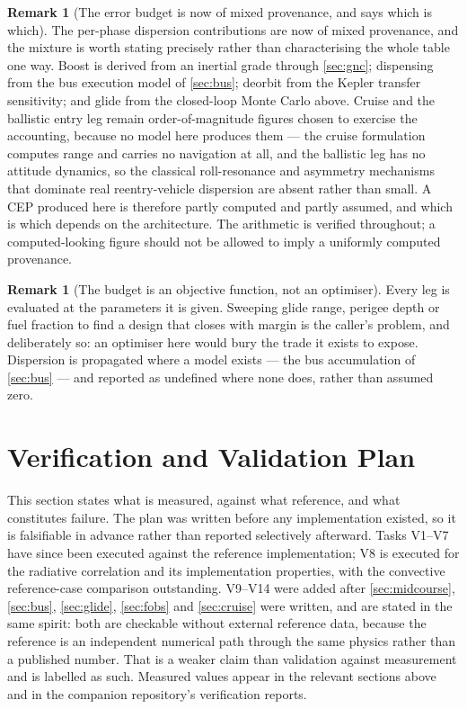 \documentclass[11pt,a4paper]{article}
\theoremstyle{definition}
\newtheorem{remark}[theorem]{Remark}
\numberwithin{equation}{section}
\begin{document}
\begin{remark}[The error budget is now of mixed provenance, and says which is which]
The per-phase dispersion contributions are now of mixed provenance, and the mixture is worth stating precisely rather than characterising the whole table one way. Boost is derived from an inertial grade through \cref{sec:gnc}; dispensing from the bus execution model of \cref{sec:bus}; deorbit from the Kepler transfer sensitivity; and glide from the closed-loop Monte Carlo above. Cruise and the ballistic entry leg remain order-of-magnitude figures chosen to exercise the accounting, because no model here produces them --- the cruise formulation computes range and carries no navigation at all, and the ballistic leg has no attitude dynamics, so the classical roll-resonance and asymmetry mechanisms that dominate real reentry-vehicle dispersion are absent rather than small. A CEP produced here is therefore partly computed and partly assumed, and which is which depends on the architecture. The arithmetic is verified throughout; a computed-looking figure should not be allowed to imply a uniformly computed provenance.
\end{remark}

\begin{remark}[The budget is an objective function, not an optimiser]
Every leg is evaluated at the parameters it is given. Sweeping glide range, perigee depth or fuel fraction to find a design that closes with margin is the caller's problem, and deliberately so: an optimiser here would bury the trade it exists to expose. Dispersion is propagated where a model exists --- the bus accumulation of \cref{sec:bus} --- and reported as undefined where none does, rather than assumed zero.
\end{remark}

\section{Verification and Validation Plan}
\label{sec:vandv}

This section states what is measured, against what reference, and what constitutes failure. The plan was written before any implementation existed, so it is falsifiable in advance rather than reported selectively afterward. Tasks V1--V7 have since been executed against the reference implementation; V8 is executed for the radiative correlation and its implementation properties, with the convective reference-case comparison outstanding. V9--V14 were added after \cref{sec:midcourse}, \cref{sec:bus}, \cref{sec:glide}, \cref{sec:fobs} and \cref{sec:cruise} were written, and are stated in the same spirit: both are checkable without external reference data, because the reference is an independent numerical path through the same physics rather than a published number. That is a weaker claim than validation against measurement and is labelled as such. Measured values appear in the relevant sections above and in the companion repository's verification reports.
\end{document}
